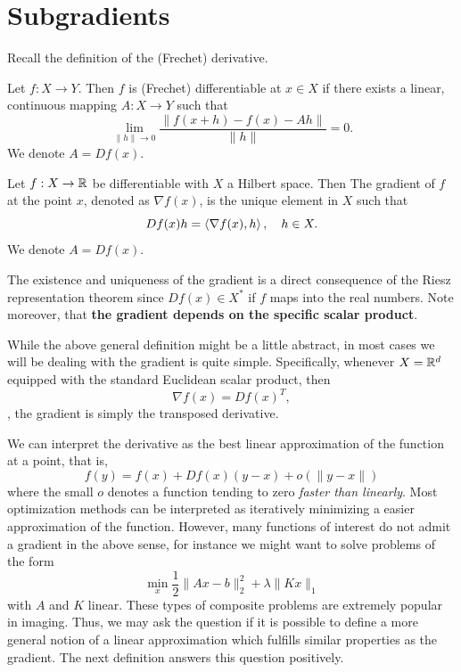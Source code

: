 \chapter{Subgradients}

Recall the definition of the (Frechet) derivative.

\begin{defn}
    Let $f:X\rightarrow Y$. Then $f$ is (Frechet) differentiable at $x\in X$ if there exists a linear, continuous mapping $A:X\rightarrow Y$ such that 
    \begin{equation}
        \lim_{\|h\|\rightarrow 0}\frac{\| f(x+h) - f(x)  -Ah\|}{\|h\|}= 0.
    \end{equation}
    We denote $A=Df(x)$.
\end{defn}

\begin{defn}[Gradient]
    Let $f:X\rightarrow \mathbb{R}$ be differentiable with $X$ a Hilbert space. Then The gradient of $f$ at the point $x$, denoted as $\nabla f(x)$, is the unique element in $X$ such that 
    \begin{equation}
        Df(x)h =  \left\langle\nabla f(x) , h\right\rangle, \quad h\in X.
    \end{equation}
    We denote $A=Df(x)$.
\end{defn}

The existence and uniqueness of the gradient is a direct consequence of the Riesz representation theorem since $Df(x)\in X^*$ if $f$ maps into the real numbers.
Note moreover, that \textbf{the gradient depends on the specific scalar product}.

While the above general definition might be a little abstract, in most cases we will be dealing with the gradient is quite simple. Specifically, whenever $X=\mathbb{R}^d$ equipped with the standard Euclidean scalar product, then 
\begin{equation}
    \nabla f(x) = Df(x)^T,
\end{equation}
\ie, the gradient is simply the transposed derivative.

We can interpret the derivative as the best linear approximation of the function at a point, that is,
\begin{equation}
    f(y) = f(x) + Df(x)(y-x) + o(\|y-x\|)
\end{equation}
where the small $o$ denotes a function tending to zero \emph{faster than linearly}. Most optimization methods can be interpreted as iteratively minimizing a easier approximation of the function. However, many functions of interest do not admit a gradient in the above sense, for instance we might want to solve problems of the form 
\begin{equation}
    \min\limits_x \frac{1}{2}\|Ax-b\|^2_2 + \lambda\|K x\|_1
\end{equation}
with $A$ and $K$ linear. These types of composite problems are extremely popular in imaging.
Thus, we may ask the question if it is possible to define a more general notion of a linear approximation which fulfills similar properties as the gradient. The next definition answers this question positively.

